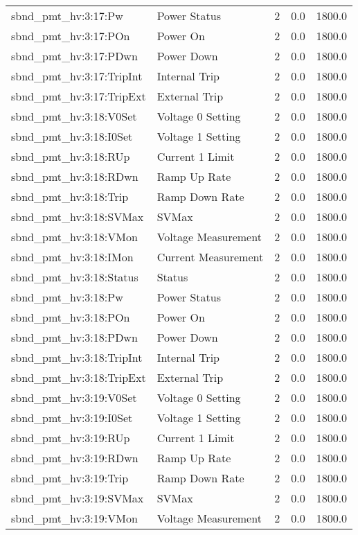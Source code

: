 \begin{center}
\begin{longtable}{l | l l l l }
sbnd\_pmt\_hv:3:17:Pw & Power Status & 2 & 0.0 & 1800.0\\ 
sbnd\_pmt\_hv:3:17:POn & Power On & 2 & 0.0 & 1800.0\\ 
sbnd\_pmt\_hv:3:17:PDwn & Power Down & 2 & 0.0 & 1800.0\\ 
sbnd\_pmt\_hv:3:17:TripInt & Internal Trip & 2 & 0.0 & 1800.0\\ 
sbnd\_pmt\_hv:3:17:TripExt & External Trip & 2 & 0.0 & 1800.0\\ 
sbnd\_pmt\_hv:3:18:V0Set & Voltage 0 Setting & 2 & 0.0 & 1800.0\\ 
sbnd\_pmt\_hv:3:18:I0Set & Voltage 1 Setting & 2 & 0.0 & 1800.0\\ 
sbnd\_pmt\_hv:3:18:RUp & Current 1 Limit & 2 & 0.0 & 1800.0\\ 
sbnd\_pmt\_hv:3:18:RDwn & Ramp Up Rate & 2 & 0.0 & 1800.0\\ 
sbnd\_pmt\_hv:3:18:Trip & Ramp Down Rate & 2 & 0.0 & 1800.0\\ 
sbnd\_pmt\_hv:3:18:SVMax & SVMax & 2 & 0.0 & 1800.0\\ 
sbnd\_pmt\_hv:3:18:VMon & Voltage Measurement & 2 & 0.0 & 1800.0\\ 
sbnd\_pmt\_hv:3:18:IMon & Current Measurement & 2 & 0.0 & 1800.0\\ 
sbnd\_pmt\_hv:3:18:Status & Status & 2 & 0.0 & 1800.0\\ 
sbnd\_pmt\_hv:3:18:Pw & Power Status & 2 & 0.0 & 1800.0\\ 
sbnd\_pmt\_hv:3:18:POn & Power On & 2 & 0.0 & 1800.0\\ 
sbnd\_pmt\_hv:3:18:PDwn & Power Down & 2 & 0.0 & 1800.0\\ 
sbnd\_pmt\_hv:3:18:TripInt & Internal Trip & 2 & 0.0 & 1800.0\\ 
sbnd\_pmt\_hv:3:18:TripExt & External Trip & 2 & 0.0 & 1800.0\\ 
sbnd\_pmt\_hv:3:19:V0Set & Voltage 0 Setting & 2 & 0.0 & 1800.0\\ 
sbnd\_pmt\_hv:3:19:I0Set & Voltage 1 Setting & 2 & 0.0 & 1800.0\\ 
sbnd\_pmt\_hv:3:19:RUp & Current 1 Limit & 2 & 0.0 & 1800.0\\ 
sbnd\_pmt\_hv:3:19:RDwn & Ramp Up Rate & 2 & 0.0 & 1800.0\\ 
sbnd\_pmt\_hv:3:19:Trip & Ramp Down Rate & 2 & 0.0 & 1800.0\\ 
sbnd\_pmt\_hv:3:19:SVMax & SVMax & 2 & 0.0 & 1800.0\\ 
sbnd\_pmt\_hv:3:19:VMon & Voltage Measurement & 2 & 0.0 & 1800.0\\ 

\end{longtable}
\end{center}

